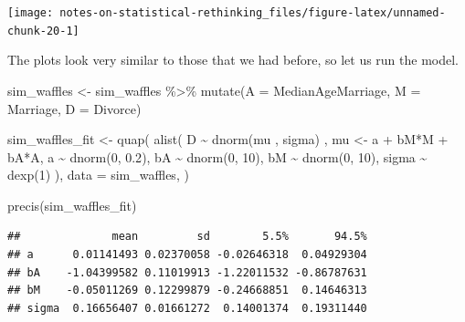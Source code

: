 \documentclass[
]{book}
\newenvironment{Shaded}{\begin{snugshade}}{\end{snugshade}}
\newcommand{\AttributeTok}[1]{\textcolor[rgb]{0.77,0.63,0.00}{#1}}
\newcommand{\DecValTok}[1]{\textcolor[rgb]{0.00,0.00,0.81}{#1}}
\newcommand{\FloatTok}[1]{\textcolor[rgb]{0.00,0.00,0.81}{#1}}
\newcommand{\FunctionTok}[1]{\textcolor[rgb]{0.00,0.00,0.00}{#1}}
\newcommand{\NormalTok}[1]{#1}
\newcommand{\OtherTok}[1]{\textcolor[rgb]{0.56,0.35,0.01}{#1}}
\newcommand{\SpecialCharTok}[1]{\textcolor[rgb]{0.00,0.00,0.00}{#1}}
\begin{document}
\begin{center}\texttt{[image: notes-on-statistical-rethinking\_files/figure-latex/unnamed-chunk-20-1]} \end{center}

The plots look very similar to those that we had before, so let us run the model.

\begin{Shaded}
\begin{Highlighting}[]
\NormalTok{sim\_waffles }\OtherTok{\textless{}{-}}
\NormalTok{  sim\_waffles }\SpecialCharTok{\%\textgreater{}\%}
  \FunctionTok{mutate}\NormalTok{(}\AttributeTok{A =}\NormalTok{ MedianAgeMarriage,}
         \AttributeTok{M =}\NormalTok{ Marriage,}
         \AttributeTok{D =}\NormalTok{ Divorce)}

\NormalTok{sim\_waffles\_fit }\OtherTok{\textless{}{-}} \FunctionTok{quap}\NormalTok{(}
  \FunctionTok{alist}\NormalTok{(}
\NormalTok{    D }\SpecialCharTok{\textasciitilde{}} \FunctionTok{dnorm}\NormalTok{(mu , sigma) ,}
\NormalTok{    mu }\OtherTok{\textless{}{-}}\NormalTok{ a }\SpecialCharTok{+}\NormalTok{ bM}\SpecialCharTok{*}\NormalTok{M }\SpecialCharTok{+}\NormalTok{ bA}\SpecialCharTok{*}\NormalTok{A,}
\NormalTok{    a }\SpecialCharTok{\textasciitilde{}} \FunctionTok{dnorm}\NormalTok{(}\DecValTok{0}\NormalTok{, }\FloatTok{0.2}\NormalTok{),}
\NormalTok{    bA }\SpecialCharTok{\textasciitilde{}} \FunctionTok{dnorm}\NormalTok{(}\DecValTok{0}\NormalTok{, }\DecValTok{10}\NormalTok{),}
\NormalTok{    bM }\SpecialCharTok{\textasciitilde{}} \FunctionTok{dnorm}\NormalTok{(}\DecValTok{0}\NormalTok{, }\DecValTok{10}\NormalTok{),}
\NormalTok{    sigma }\SpecialCharTok{\textasciitilde{}} \FunctionTok{dexp}\NormalTok{(}\DecValTok{1}\NormalTok{)}
\NormalTok{  ), }
  \AttributeTok{data =}\NormalTok{ sim\_waffles,}
\NormalTok{)}

\FunctionTok{precis}\NormalTok{(sim\_waffles\_fit)}
\end{Highlighting}
\end{Shaded}

\begin{verbatim}
##              mean         sd        5.5%       94.5%
## a      0.01141493 0.02370058 -0.02646318  0.04929304
## bA    -1.04399582 0.11019913 -1.22011532 -0.86787631
## bM    -0.05011269 0.12299879 -0.24668851  0.14646313
## sigma  0.16656407 0.01661272  0.14001374  0.19311440
\end{verbatim}
\end{document}
